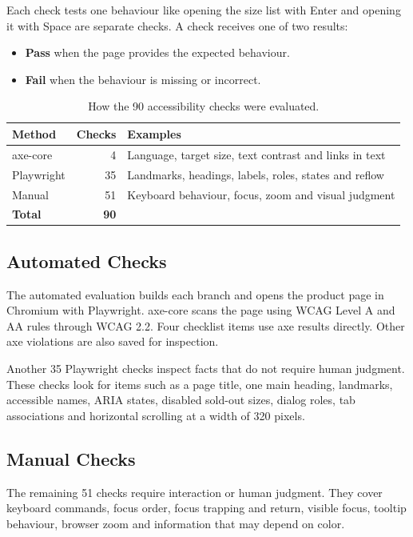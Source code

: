 \documentclass[conference]{IEEEtran}
\begin{document}
Each check tests one behaviour like opening the size list with Enter and opening it with Space are separate checks. A check receives one of two results:
\begin{itemize}
  \item \textbf{Pass} when the page provides the expected behaviour.
  \item \textbf{Fail} when the behaviour is missing or incorrect.
\end{itemize}

\begin{table}[H]
  \centering
  \caption{How the 90 accessibility checks were evaluated.}
  \label{tab:evaluation-methods}
  \begin{tabularx}{\columnwidth}{l r X}
    \hline
    \textbf{Method} & \textbf{Checks} & \textbf{Examples} \\
    \hline
    axe-core & 4 & Language, target size, text contrast and links in text \\
    Playwright & 35 & Landmarks, headings, labels, roles, states and reflow \\
    Manual & 51 & Keyboard behaviour, focus, zoom and visual judgment \\
    \hline
    \textbf{Total} & \textbf{90} & \\
    \hline
  \end{tabularx}
\end{table}

\subsection{Automated Checks}

The automated evaluation builds each branch and opens the product page in Chromium with Playwright. axe-core scans the page using WCAG Level A and AA rules through WCAG 2.2. Four checklist items use axe results directly. Other axe violations are also saved for inspection.

Another 35 Playwright checks inspect facts that do not require human judgment. These checks look for items such as a page title, one main heading, landmarks, accessible names, ARIA states, disabled sold-out sizes, dialog roles, tab associations and horizontal scrolling at a width of 320 pixels.

\subsection{Manual Checks}

The remaining 51 checks require interaction or human judgment. They cover keyboard commands, focus order, focus trapping and return, visible focus, tooltip behaviour, browser zoom and information that may depend on color.
\end{document}
